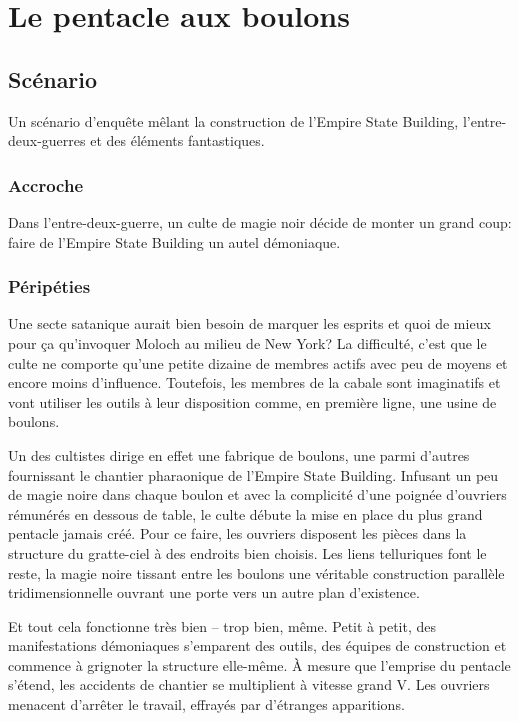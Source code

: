 \chapter{Le pentacle aux boulons}

\section{Scénario}

Un scénario d'enquête mêlant la construction de l'Empire State Building, l'entre-deux-guerres et des éléments fantastiques.

\subsection{Accroche}

Dans l'entre-deux-guerre, un culte de magie noir décide de monter un grand coup: faire de l'Empire State Building un autel démoniaque.

\subsection{Péripéties}

Une secte satanique aurait bien besoin de marquer les esprits et quoi de mieux pour ça qu'invoquer Moloch au milieu de New York?
La difficulté, c'est que le culte ne comporte qu'une petite dizaine de membres actifs avec peu de moyens et encore moins d'influence.
Toutefois, les membres de la cabale sont imaginatifs et vont utiliser les outils à leur disposition comme, en première ligne, une usine de boulons.

Un des cultistes dirige en effet une fabrique de boulons, une parmi d'autres fournissant le chantier pharaonique de l'Empire State Building.
Infusant un peu de magie noire dans chaque boulon et avec la complicité d'une poignée d'ouvriers rémunérés en dessous de table, le culte débute la mise en place du plus grand pentacle jamais créé.
Pour ce faire, les ouvriers disposent les pièces dans la structure du gratte-ciel à des endroits bien choisis.
Les liens telluriques font le reste, la magie noire tissant entre les boulons une véritable construction parallèle tridimensionnelle ouvrant une porte vers un autre plan d'existence.

Et tout cela fonctionne très bien -- trop bien, même.
Petit à petit, des manifestations démoniaques s'emparent des outils, des équipes de construction et commence à grignoter la structure elle-même.
À mesure que l'emprise du pentacle s'étend, les accidents de chantier se multiplient à vitesse grand V.
Les ouvriers menacent d'arrêter le travail, effrayés par d'étranges apparitions.

